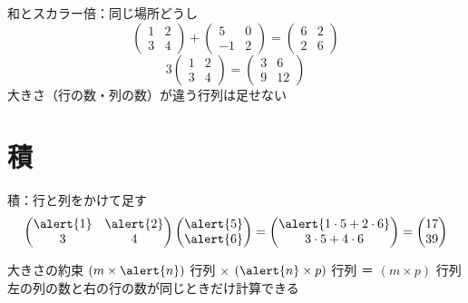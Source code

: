 \documentclass[aspectratio=169]{beamer}
\begin{document}
\begin{frame}{和とスカラー倍：同じ場所どうし}
  \[
    \begin{pmatrix} 1 & 2 \\ 3 & 4 \end{pmatrix}
    + \begin{pmatrix} 5 & 0 \\ -1 & 2 \end{pmatrix}
    = \begin{pmatrix} 6 & 2 \\ 2 & 6 \end{pmatrix}
  \]
  \[
    3 \begin{pmatrix} 1 & 2 \\ 3 & 4 \end{pmatrix}
    = \begin{pmatrix} 3 & 6 \\ 9 & 12 \end{pmatrix}
  \]
  {\small 大きさ（行の数・列の数）が違う行列は足せない}
\end{frame}

\section{積}

\begin{frame}{積：行と列をかけて足す}
  \[
    \begin{pmatrix} \alert{1} & \alert{2} \\ 3 & 4 \end{pmatrix}
    \begin{pmatrix} \alert{5} \\ \alert{6} \end{pmatrix}
    = \begin{pmatrix} \alert{1 \cdot 5 + 2 \cdot 6} \\ 3 \cdot 5 + 4 \cdot 6 \end{pmatrix}
    = \begin{pmatrix} 17 \\ 39 \end{pmatrix}
  \]
  \medskip
  \begin{block}{大きさの約束}
    $(m \times \alert{n})$ 行列 × $(\alert{n} \times p)$ 行列 ＝ $(m \times p)$ 行列\\
    {\small 左の列の数と右の行の数が同じときだけ計算できる}
  \end{block}
\end{frame}
\end{document}

